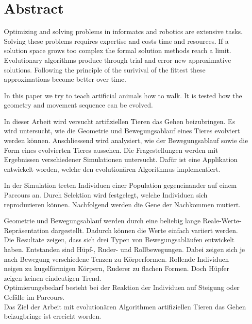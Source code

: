 %
%


\chapter{Abstract}

  Optimizing and solving problems in informatcs and robotics are extensive tasks.
  Solving these problems requires expertise and costs time and resources.
  If a solution space grows too complex the formal solution methods reach a limit.
  Evolutionary algorithms produce through trial and error new approximative solutions.
  Following the principle of the surivival of the fittest these approximations become better over time.

  \smallskip

  In this paper we try to teach artificial animals how to walk.
  It is tested how the geometry and movement sequence can be evolved.


  In dieser Arbeit wird versucht artifiziellen Tieren das Gehen beizubringen.
  Es wird untersucht, wie die Geometrie und Bewegungsablauf eines Tieres evolviert werden können.
  Anschliessend wird analysiert, wie der Bewegungsablauf sowie die Form eines evolvierten Tieres aussehen.
  Die Fragestellungen werden mit Ergebnissen verschiedener Simulationen untersucht.
  Dafür ist eine Applikation entwickelt worden, welche den evolutionären Algorithmus implementiert.

  \smallskip

  In der Simulation treten Individuen einer Population gegeneinander auf einem Parcours an.
  Durch Selektion wird festgelegt, welche Individuen sich reproduzieren können.
  Nachfolgend werden die Gene der Nachkommen mutiert.

  \smallskip

  Geometrie und Bewegungsablauf werden durch eine beliebig lange Reale-Werte-Repräsentation dargestellt.
  Dadurch können die Werte einfach variiert werden.
  Die Resultate zeigen, dass sich drei Typen von Bewegungsabläufen entwickelt haben.
  Entstanden sind Hüpf-, Ruder- und Rollbewegungen.
  Dabei zeigen sich je nach Bewegung verschiedene Tenzen zu Körperformen.
  Rollende Individuen neigen zu kugelförmigen Körpern, Ruderer zu flachen Formen.
  Doch Hüpfer zeigen keinen eindeutigen Trend.
  \\
  Optimierungsbedarf besteht bei der Reaktion der Individuen auf Steigung oder Gefälle im Parcours.
  \\
  Das Ziel der Arbeit mit evolutionären Algorithmen artifiziellen Tieren das Gehen beizugbringe ist erreicht worden.
